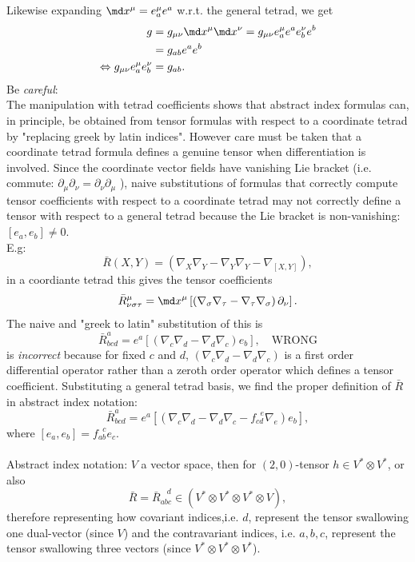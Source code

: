 Likewise expanding $\md x^{\mu}=e^{\mu}_a e^a$ w.r.t. the general tetrad, we get
\begin{align*}
	g&= g_{\mu \nu} \md x^{\mu} \md x^{\nu} = g_{\mu \nu} e^{\mu}_a e^a e^{\nu}_b e^b \\
	&=g_{ab} e^a e^b \\
	\Leftrightarrow g_{\mu \nu} e^{\mu}_a e^{\nu}_b &=g_{ab}.
\end{align*}
Be \emph{careful}:\\
The manipulation with tetrad coefficients shows that abstract index formulas can, in principle, be obtained from tensor formulas with respect to a coordinate tetrad by "replacing greek by latin indices". However care must be taken that a coordinate tetrad formula defines a genuine tensor when differentiation is involved. Since the coordinate vector fields have vanishing Lie bracket (i.e. commute: $ \partial_{\mu} \partial_{\nu} =\partial_{\nu} \partial_{\mu}$ ), naive substitutions of formulas that correctly compute tensor coefficients with respect to a coordinate tetrad may not correctly define a tensor with respect to a general tetrad because the Lie bracket is non-vanishing:$[e_a,e_b]\neq 0$.\\
E.g:
\begin{equation}
	\bar{R}(X,Y) =\left(\nabla_X \nabla_Y - \nabla_Y \nabla_Y - \nabla_{[X,Y]} \right),
\end{equation}
in a coordiante tetrad this gives the tensor coefficients
\begin{equation}
	\bar{R}^{\mu}_{\nu \sigma \tau} = \md x^{\mu} \left[\left(\nabla_{\sigma} \nabla_{\tau} - \nabla_{\tau} \nabla_{\sigma}\right) \partial_{\nu}\right].
\end{equation}
The naive and  "greek to latin" substitution of this is 
\begin{equation}
	\bar{R}^a_{bcd} = e^a\left[\left(\nabla_c \nabla_d - \nabla_d \nabla_c\right)e_b\right],\quad \mathrm{WRONG}
\end{equation}
is \emph{incorrect} because for fixed $c$ and $d$, $\left(\nabla_c \nabla_d - \nabla_d \nabla_c\right)$ is a first order differential operator rather than a zeroth order operator which defines a tensor coefficient. Substituting a general tetrad basis, we find the proper definition of $\bar{R}$ in abstract index notation:
\begin{equation}
	\bar{R}^a_{bcd} = e^a\left[\left(\nabla_c \nabla_d - \nabla_d \nabla_c - f^{\;\; e}_{cd} \nabla_e\right) e_b\right],
\end{equation}
where $\left[e_a,e_b\right]=f^{\; \; c}_{ab} e_c$.
\\
\\
Abstract index notation: $V$ a vector space, then for $(2,0)$-tensor $h \in V^* \otimes V^*$, or also
\begin{equation}
	\bar{R} = \bar{R}^{\; \; \; d}_{abc} \in \left(V^* \otimes V^* \otimes V^* \otimes V\right),
\end{equation}
therefore representing how covariant indices,i.e. $d$, represent the tensor swallowing one dual-vector (since $V$) and the contravariant indices, i.e. $a,b,c$, represent the tensor swallowing three vectors (since $V^* \otimes V^* \otimes V^*$).
